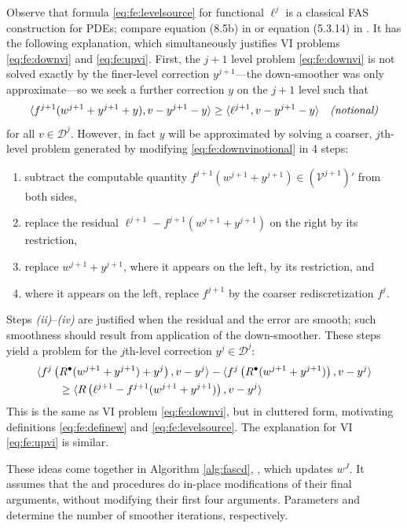\documentclass[letterpaper,final,12pt,reqno]{amsart}
\theoremstyle{cstyle}
\theoremstyle{cstyle*}
\theoremstyle{dstyle}
\numberwithin{equation}{section}
\numberwithin{figure}{section}
\numberwithin{table}{section}
\numberwithin{theorem}{section}
\newcommand{\ip}[2]{\langle#1,#2\rangle}
\newcommand{\iR}{R^{\bullet}}
\begin{document}
Observe that formula \eqref{eq:fe:levelsource} for functional $\ell^j$ is a classical FAS construction for PDEs; compare equation (8.5b) in \cite{BrandtLivne2011} or equation (5.3.14) in \cite{Trottenbergetal2001}.  It has the following explanation, which simultaneously justifies VI problems \eqref{eq:fe:downvi} and \eqref{eq:fe:upvi}.  First, the $j+1$ level problem \eqref{eq:fe:downvi} is not solved exactly by the finer-level correction $y^{j+1}$---the down-smoother was only approximate---so we seek a further correction $y$ on the $j+1$ level such that
\begin{equation}
\ip{f^{j+1}(w^{j+1}+y^{j+1}+y)}{v-y^{j+1}-y} \ge \ip{\ell^{j+1}}{v-y^{j+1}-y} \quad \text{\emph{(notional)}} \label{eq:fe:downvinotional}
\end{equation}
for all $v\in \mathcal{D}^j$.  However, in fact $y$ will be approximated by solving a coarser, $j$th-level problem generated by modifying \eqref{eq:fe:downvinotional} in 4 steps:
\begin{enumerate}
\item subtract the computable quantity $f^{j+1}(w^{j+1}+y^{j+1}) \in (\mathcal{V}^{j+1})'$ from both sides,
\item replace the residual $\ell^{j+1}-f^{j+1}(w^{j+1}+y^{j+1})$ on the right by its restriction,
\item replace $w^{j+1}+y^{j+1}$, where it appears on the left, by its restriction, and
\item where it appears on the left, replace $f^{j+1}$ by the coarser rediscretization $f^j$.
\end{enumerate}
Steps \emph{(ii)}--\emph{(iv)} are justified when the residual and the error are smooth; such smoothness should result from application of the down-smoother.  These steps yield a problem for the $j$th-level correction $y^j \in \mathcal{D}^j$:
\begin{align}
&\ip{f^j\left(\iR(w^{j+1}+y^{j+1})+y^j\right)}{v-y^j} - \ip{f^j\left(\iR(w^{j+1}+y^{j+1})\right)}{v-y^j} \label{eq:fe:downvicluttered} \\
&\qquad \ge \ip{R\left(\ell^{j+1}-f^{j+1}(w^{j+1}+y^{j+1})\right)}{v-y^j} \notag
\end{align}
This is the same as VI problem \eqref{eq:fe:downvi}, but in cluttered form, motivating definitions \eqref{eq:fe:definew} and \eqref{eq:fe:levelsource}.  The explanation for VI \eqref{eq:fe:upvi} is similar.

These ideas come together in Algorithm \ref{alg:fascd}, , which updates $w^J$.  It assumes that the  and  procedures do in-place modifications of their final arguments, without modifying their first four arguments.  Parameters  and  determine the number of smoother iterations, respectively.
\end{document}
